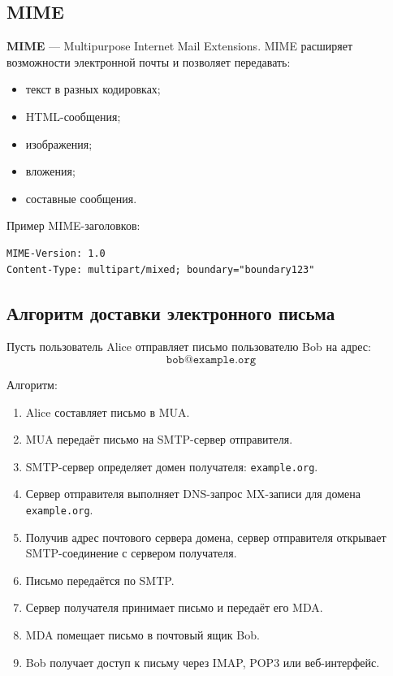 \documentclass[12pt,a4paper]{article}
\begin{document}
\subsection{MIME}

\textbf{MIME} --- Multipurpose Internet Mail Extensions. MIME расширяет возможности электронной почты и позволяет передавать:
\begin{itemize}
    \item текст в разных кодировках;
    \item HTML-сообщения;
    \item изображения;
    \item вложения;
    \item составные сообщения.
\end{itemize}

Пример MIME-заголовков:
\begin{lstlisting}
MIME-Version: 1.0
Content-Type: multipart/mixed; boundary="boundary123"
\end{lstlisting}

\subsection{Алгоритм доставки электронного письма}

Пусть пользователь Alice отправляет письмо пользователю Bob на адрес:
\[
\texttt{bob@example.org}
\]

Алгоритм:
\begin{enumerate}
    \item Alice составляет письмо в MUA.
    \item MUA передаёт письмо на SMTP-сервер отправителя.
    \item SMTP-сервер определяет домен получателя: \texttt{example.org}.
    \item Сервер отправителя выполняет DNS-запрос MX-записи для домена \texttt{example.org}.
    \item Получив адрес почтового сервера домена, сервер отправителя открывает SMTP-соединение с сервером получателя.
    \item Письмо передаётся по SMTP.
    \item Сервер получателя принимает письмо и передаёт его MDA.
    \item MDA помещает письмо в почтовый ящик Bob.
    \item Bob получает доступ к письму через IMAP, POP3 или веб-интерфейс.
\end{enumerate}
\end{document}
